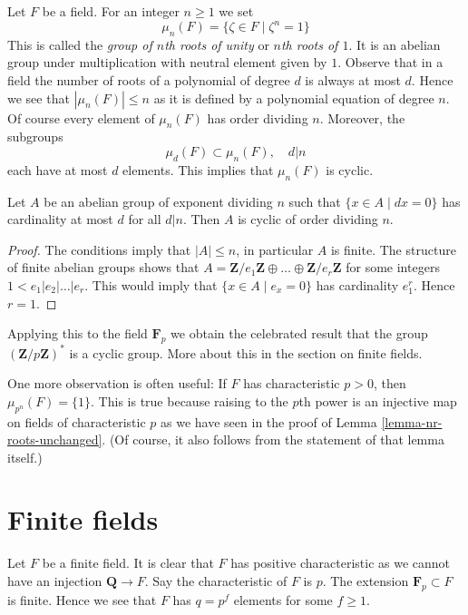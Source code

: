 \noindent
Let $F$ be a field. For an integer $n \geq 1$ we set
$$
\mu_n(F) = \{\zeta \in F \mid \zeta^n = 1\}
$$
This is called the {\it group of $n$th roots of unity} or
{\it $n$th roots of $1$}. It is an abelian group under multiplication
with neutral element given by $1$.
Observe that in a field the number of roots of a polynomial of degree $d$
is always at most $d$. Hence we see that $|\mu_n(F)| \leq n$
as it is defined by a polynomial equation of degree $n$.
Of course every element of $\mu_n(F)$ has order dividing $n$.
Moreover, the subgroups
$$
\mu_d(F) \subset \mu_n(F),\quad d | n
$$
each have at most $d$ elements. This implies that $\mu_n(F)$ is cyclic.

\begin{lemma}
\label{lemma-cyclic}
Let $A$ be an abelian group of exponent dividing $n$ such that
$\{x \in A \mid dx = 0\}$ has cardinality at most $d$ for all $d | n$.
Then $A$ is cyclic of order dividing $n$.
\end{lemma}

\begin{proof}
The conditions imply that $|A| \leq n$, in particular $A$ is finite.
The structure of finite abelian groups shows that
$A = \mathbf{Z}/e_1\mathbf{Z} \oplus \ldots \oplus \mathbf{Z}/e_r\mathbf{Z}$
for some integers $1 < e_1 | e_2 | \ldots | e_r$. This would imply
that $\{x \in A \mid e_ x = 0\}$ has cardinality $e_1^r$. Hence
$r = 1$.
\end{proof}

\noindent
Applying this to the field $\mathbf{F}_p$ we obtain the celebrated result
that the group $(\mathbf{Z}/p\mathbf{Z})^*$ is a cyclic group. More about
this in the section on finite fields.

\medskip\noindent
One more observation is often useful: If $F$ has characteristic
$p > 0$, then $\mu_{p^n}(F) = \{1\}$. This is true because raising
to the $p$th power is an injective map on fields of characteristic $p$
as we have seen in the proof of Lemma \ref{lemma-nr-roots-unchanged}.
(Of course, it also follows from the statement of that lemma itself.)






\section{Finite fields}
\label{section-finite}

\noindent
Let $F$ be a finite field. It is clear that $F$ has positive characteristic
as we cannot have an injection $\mathbf{Q} \to F$. Say the characteristic
of $F$ is $p$. The extension $\mathbf{F}_p \subset F$ is finite.
Hence we see that $F$ has $q = p^f$ elements for some $f \geq 1$.

